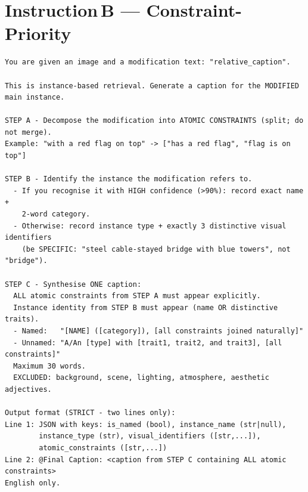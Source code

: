 \section*{Instruction\,B --- Constraint-Priority}
\begin{verbatim}
You are given an image and a modification text: "relative_caption".

This is instance-based retrieval. Generate a caption for the MODIFIED main instance.

STEP A - Decompose the modification into ATOMIC CONSTRAINTS (split; do not merge).
Example: "with a red flag on top" -> ["has a red flag", "flag is on top"]

STEP B - Identify the instance the modification refers to.
  - If you recognise it with HIGH confidence (>90%): record exact name +
    2-word category.
  - Otherwise: record instance type + exactly 3 distinctive visual identifiers
    (be SPECIFIC: "steel cable-stayed bridge with blue towers", not "bridge").

STEP C - Synthesise ONE caption:
  ALL atomic constraints from STEP A must appear explicitly.
  Instance identity from STEP B must appear (name OR distinctive traits).
  - Named:   "[NAME] ([category]), [all constraints joined naturally]"
  - Unnamed: "A/An [type] with [trait1, trait2, and trait3], [all constraints]"
  Maximum 30 words.
  EXCLUDED: background, scene, lighting, atmosphere, aesthetic adjectives.

Output format (STRICT - two lines only):
Line 1: JSON with keys: is_named (bool), instance_name (str|null),
        instance_type (str), visual_identifiers ([str,...]),
        atomic_constraints ([str,...])
Line 2: @Final Caption: <caption from STEP C containing ALL atomic constraints>
English only.
\end{verbatim}

